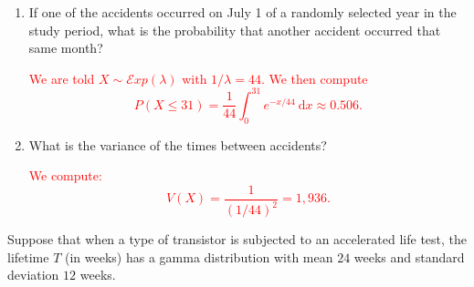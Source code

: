 \documentclass[12pt,reqno]{amsart}
\begin{document}
\medskip
\begin{enumerate}
\item If one of the accidents occurred on July 1 of a randomly selected year in the study period, what is the probability that another accident occurred that same month?

\bigskip
\textcolor{red}{We are told $X\sim \mathcal{E}xp(\lambda)$ with $1/\lambda = 44$. We then compute
	\[P(X \leq 31) = \frac{1}{44}\int_0^{31}e^{-x/44} \ \text{d} x \approx 0.506.
	\]}
\bigskip

\item What is the variance of the times between accidents?

\bigskip
\textcolor{red}{We compute:
	\[V(X) = \frac{1}{(1/44)^2} =1{,}936.
	\]}
\end{enumerate}













\bigskip
\prob Suppose that when a type of transistor is subjected to an accelerated life test, the lifetime $T$ (in weeks) has a gamma distribution with mean $24$ weeks and standard deviation $12$ weeks.
\end{document}
